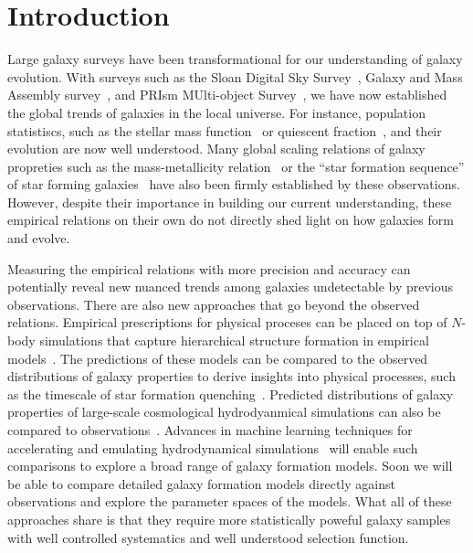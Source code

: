 \section{Introduction} \label{sec:intro} 
Large galaxy surveys have been transformational for our understanding of galaxy
evolution. 
With surveys such as the Sloan Digital Sky Survey~\citep[SDSS][]{york2000},
Galaxy and Mass Assembly survey~\citep[GAMA][]{driver2011}, and 
PRIsm MUlti-object Survey~\citep[PRIMUS][]{coil2011}, 
we have now established the global trends of galaxies in the local universe. 
For instance, population statistiscs, such as the stellar mass
function~\citep{} or quiescent fraction~\citep{}, and their evolution are now 
well understood. 
Many global scaling relations of galaxy propreties such as the mass-metallicity
relation~\citep{} or
the ``star formation sequence'' of star forming galaxies~\citep{} have also
been firmly established by these observations. 
However, despite their importance in building our current understanding, these
empirical relations on their own do not directly shed light on how galaxies
form and evolve. 

Measuring the empirical relations with more precision and accuracy can
potentially reveal new nuanced trends among galaxies undetectable by previous
observations.
There are also new approaches that go beyond the observed relations.
Empirical prescriptions for physical proceses can be placed on top of $N$-body
simulations that capture hierarchical structure formation in empirical 
models~\citep[\emph{e.g.} {\sc UniverseMachine}][]{behroozi2019}. 
The predictions of these models can be compared to the observed distributions
of galaxy properties to derive insights into physical processes, such as the
timescale of star formation quenching~\citep{wetzel2013, hahn2017, tinker2017}. 
Predicted distributions of galaxy properties of large-scale cosmological 
hydrodyanmical simulations can also be compared to 
observations~\citep[\emph{e.g.}][]{genel2014, somerville2015, dave2017,
trayford2017, donnari2020, dickey2021}.
Advances in machine learning techniques for accelerating and emulating
hydrodynamical simulations~\citep{} will enable such comparisons to explore a
broad range of galaxy formation models.
Soon we will be able to compare detailed galaxy formation models directly
against observations and explore the parameter spaces of the models. 
What all of these approaches share is that they require more statistically
poweful galaxy samples with well controlled systematics and well understood
selection function. 

